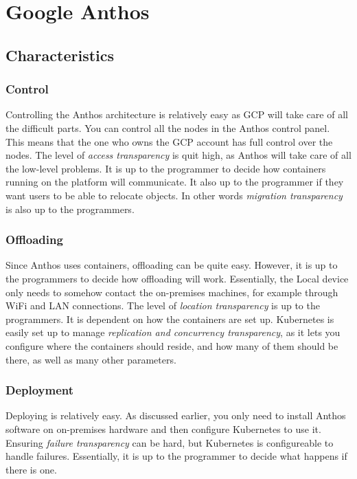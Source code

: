 






\section{Google Anthos}
\subsection{Characteristics}
\subsubsection{Control}
Controlling the Anthos architecture is relatively easy as GCP will take care of all the difficult parts. You can control all the nodes in the Anthos control panel. This means that the one who owns the GCP account has full control over the nodes. The level of \textit{access  transparency} is quit high, as Anthos will take care of all the low-level problems. It is up to the programmer to decide how containers running on the platform will communicate. It also up to the programmer if they want users to be able to relocate objects. In other words \textit{migration transparency} is also up to the programmers.

\subsubsection{Offloading}
Since Anthos uses containers, offloading can be quite easy. However, it is up to the programmers to decide how offloading will work. Essentially, the Local device only needs to somehow contact the on-premises machines, for example through WiFi and LAN connections. The level of \textit{location transparency} is up to the programmers. It is dependent on how the containers are set up. Kubernetes is easily set up to manage \textit{replication and concurrency transparency}, as it lets you configure where the containers should reside, and how many of them should be there, as well as many other parameters.

\subsubsection{Deployment}
Deploying is relatively easy. As discussed earlier, you only need to install Anthos software on on-premises hardware and then configure Kubernetes to use it. Ensuring \textit{failure transparency} can be hard, but Kubernetes is configureable to handle failures. Essentially, it is up to the programmer to decide what happens if there is one.






